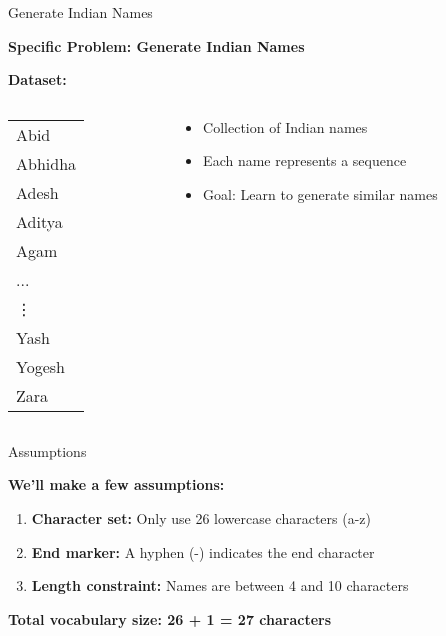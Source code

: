 \documentclass[usenames,dvipsnames]{beamer}
\begin{document}
\begin{frame}{Generate Indian Names}
\begin{center}
\textbf{Specific Problem: Generate Indian Names}
\end{center}

\vspace{0.5cm}
\begin{center}
\textbf{Dataset:}
\end{center}

\begin{columns}
\begin{column}{0.5\textwidth}
\begin{center}
\begin{tabular}{l}
Abid \\
Abhidha \\
Adesh \\
Aditya \\
Agam \\
... \\
\vdots \\
Yash \\
Yogesh \\
Zara
\end{tabular}
\end{center}
\end{column}
\begin{column}{0.5\textwidth}
\begin{itemize}
\item Collection of Indian names
\item Each name represents a sequence
\item Goal: Learn to generate similar names
\end{itemize}
\end{column}
\end{columns}
\end{frame}

\begin{frame}{Assumptions}
\begin{center}
\textbf{We'll make a few assumptions:}
\end{center}

\vspace{1cm}

\begin{enumerate}
\item \textbf{Character set:} Only use 26 lowercase characters (a-z)
\pause
\item \textbf{End marker:} A hyphen (-) indicates the end character  
\pause
\item \textbf{Length constraint:} Names are between 4 and 10 characters
\end{enumerate}

\vspace{1cm}
\begin{center}
\textbf{Total vocabulary size: 26 + 1 = 27 characters}
\end{center}
\end{frame}
\end{document}
